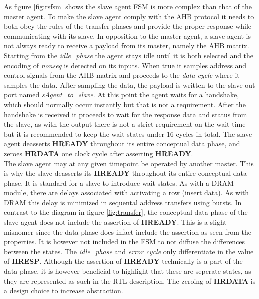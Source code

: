 As figure \ref{fig:rsfsm} shows the slave agent FSM is more complex than that of the master agent. To make the slave agent comply with the AHB protocol it needs to both obey the rules of the transfer phases and provide the proper response while communicating with its slave. In opposition to the master agent, a slave agent is not always ready to receive a payload from its master, namely the AHB matrix. Starting from the \textit{idle\_phase} the agent stays idle until it is both selected and the encoding of \textit{nonseq} is detected on its inputs. When true it samples address and control signals from the AHB matrix and proceeds to the \textit{data cycle} where it samples the data. After sampling the data, the payload is written to the slave out port named \textit{sAgent\_to\_slave}. At this point the agent waits for a handshake, which should normally occur instantly but that is not a requirement. After the handshake is received it proceeds to wait for the response data and status from the slave, as with the output there is not a strict requirement on the wait time but it is recommended to keep the wait states under 16 cycles in total. The slave agent deasserts \textbf{HREADY} throughout its entire conceptual data phase, and zeroes \textbf{HRDATA} one clock cycle after asserting \textbf{HREADY}. \\
\newline
The slave agent may at any given timepoint be operated by another master. This is why the slave deasserts its \textbf{HREADY} throughout its entire conceptual data phase. It is standard for a slave to introduce wait states. As with a DRAM module, there are delays associated with activating a row (insert data). As with DRAM this delay is minimized in sequental address transfers using bursts. In contrast to the diagram in figure \ref{fig:transfer}, the conceptual data phase of the slave agent does not include the assertion of \textbf{HREADY}. This is a slight misnomer since the data phase does infact include the assertion as seen from the properties. It is however not included in the FSM to not diffuse the differences between the states. The \textit{idle\_phase} and \textit{error cycle} only differentiate in the value of \textbf{HRESP}. Although the assertion of \textbf{HREADY} technically is a part of the data phase, it is however beneficial to highlight that these are seperate states, as they are represented as such in the RTL description. The zeroing of \textbf{HRDATA} is a design choice to increase abstraction. 
\newpage

